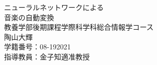 \begin{titlepage}
\begin{center}
\vspace*{160truept}
{\huge ニューラルネットワークによる}\\
\vspace{10truept}
{\huge 音楽の自動変換}\\
\vspace{200truept}
{\Large 教養学部後期課程学際科学科総合情報学コース}\\
\vspace{10truept}
{\Large 陶山大輝}\\
\vspace{10truept}
{\Large 学籍番号：08-192021}\\
\vspace{10truept}
{\Large 指導教員：金子知適准教授}\\  
\end{center}
\end{titlepage}